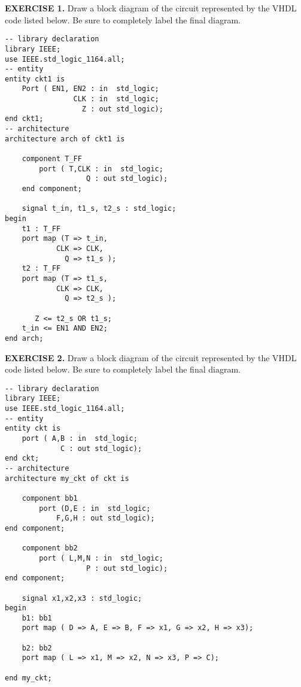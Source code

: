 \vspace{20pt}
\noindent
\begin{minipage}{1\textwidth}
\textbf{EXERCISE 1.}
Draw a block diagram of the circuit represented by the VHDL code listed below. Be sure to completely label the final diagram.
\vspace{10pt}

\begin{lstlisting}
-- library declaration
library IEEE;
use IEEE.std_logic_1164.all;
-- entity
entity ckt1 is
    Port ( EN1, EN2 : in  std_logic;
                CLK : in  std_logic;
                  Z : out std_logic);
end ckt1;
-- architecture
architecture arch of ckt1 is

    component T_FF
        port ( T,CLK : in  std_logic;
                   Q : out std_logic);
    end component;

    signal t_in, t1_s, t2_s : std_logic;
begin
    t1 : T_FF
    port map (T => t_in,
            CLK => CLK,
              Q => t1_s );
    t2 : T_FF
    port map (T => t1_s,
            CLK => CLK,
              Q => t2_s );

       Z <= t2_s OR t1_s;
    t_in <= EN1 AND EN2;
end arch;
\end{lstlisting}
\end{minipage}

\vspace{20pt}
\noindent
\begin{minipage}{1\textwidth}
\textbf{EXERCISE 2.}
Draw a block diagram of the circuit represented by the VHDL code listed below. Be sure to completely label the final diagram.
\vspace{10pt}

\begin{lstlisting}
-- library declaration
library IEEE;
use IEEE.std_logic_1164.all;
-- entity
entity ckt is
    port ( A,B : in  std_logic;
             C : out std_logic);
end ckt;
-- architecture
architecture my_ckt of ckt is

    component bb1
        port (D,E : in  std_logic;
            F,G,H : out std_logic);
end component;

    component bb2
        port ( L,M,N : in  std_logic;
                   P : out std_logic);
end component;

    signal x1,x2,x3 : std_logic;
begin
    b1: bb1
    port map ( D => A, E => B, F => x1, G => x2, H => x3);

    b2: bb2
    port map ( L => x1, M => x2, N => x3, P => C);

end my_ckt;
\end{lstlisting}
\end{minipage}

